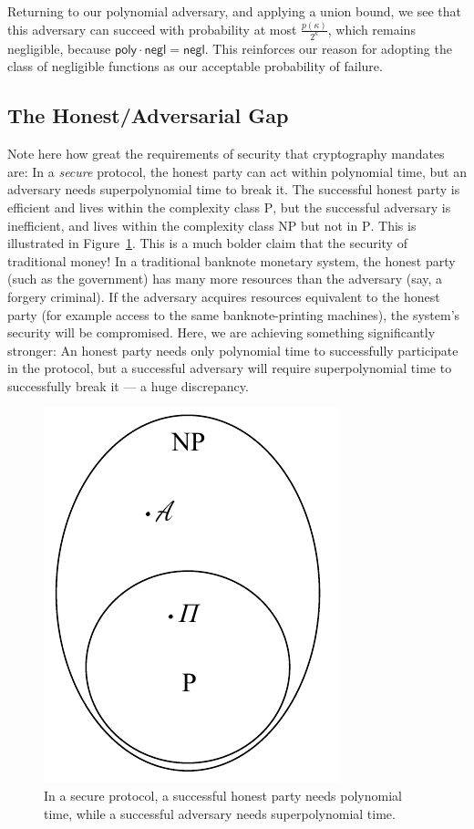 Returning to our polynomial adversary, and applying a union bound, we see that
this adversary can succeed with probability at most $\frac{p(\kappa)}{2^\kappa}$,
which remains negligible, because $\textsf{poly} \cdot \textsf{negl} = \textsf{negl}$.
This reinforces our reason for adopting the class of
negligible functions as our acceptable probability of failure.

\subsection*{The Honest/Adversarial Gap}

Note here how great the requirements of security that cryptography mandates are:
In a \emph{secure} protocol, the honest party can act within polynomial time,
but an adversary needs superpolynomial time to break it. The successful honest party
is efficient and lives within the
complexity class \textsc{P}, but the successful adversary is inefficient, and
lives within the complexity class \textsc{NP} but not in \textsc{P}. This is
illustrated in Figure~\ref{fig.p-vs-np}. This is a much bolder claim that the
security of traditional money! In a traditional banknote monetary system, the honest party
(such as the government) has many more resources than the adversary (say, a forgery
criminal). If the adversary acquires resources equivalent to the honest party (for example
access to the same banknote-printing machines), the system's security will be
compromised. Here, we are achieving something significantly stronger: An honest
party needs only polynomial time to successfully participate in the protocol,
but a successful adversary will require superpolynomial time to successfully break it
--- a huge discrepancy.

\begin{figure}[h]
    \centering
    \includegraphics[width=0.3 \columnwidth,keepaspectratio]{figures/p-vs-np.pdf}
    \caption{In a secure protocol, a successful honest party needs polynomial time,
    while a successful adversary needs superpolynomial time.}
    \label{fig.p-vs-np}
\end{figure}

